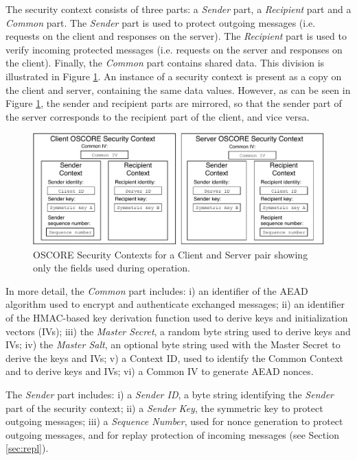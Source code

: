 {The security context consists of three parts:  a \emph{Sender} part, a \emph{Recipient} part and a \emph{Common} part. The \emph{Sender} part is used to protect outgoing messages (i.e. requests on the client and responses on the server). The \emph{Recipient} part is used to verify incoming protected messages (i.e. requests on the server and responses on the client). Finally, the \emph{Common} part contains shared data. This division is illustrated in Figure \ref{fig:security_context}. An instance of a security context is present as a copy on the client and server, containing the same data values. However, as can be seen in Figure \ref{fig:security_context}, the sender and recipient parts are mirrored, so that the sender part of the server corresponds to the recipient part of the client, and vice versa.
\begin{figure}[ht]
    \centering
     \includegraphics[width=\textwidth]{papers/oscore/images/OSCORE_contexts.pdf}
    \caption{OSCORE Security Contexts for a Client and Server pair showing only the fields used during operation.}
    \label{fig:security_context}
\end{figure}{}

In more detail, the \emph{Common} part includes: i) an identifier of the AEAD algorithm used to encrypt and authenticate exchanged messages; ii) an identifier of the HMAC-based key derivation function used to derive keys and initialization vectors (IVs); iii) the \emph{Master Secret}, a random byte string used to derive keys and IVs; iv) the \emph{Master Salt}, an optional byte string used with the Master Secret to derive the keys and IVs; v) a Context ID, used to identify the Common Context and to derive keys and IVs; vi) a Common IV to generate AEAD nonces.

The \emph{Sender} part includes: i) a \emph{Sender ID}, a byte string identifying the \emph{Sender} part of the security context; ii) a \emph{Sender Key}, the symmetric key to protect outgoing messages; iii) a \emph{Sequence Number}, used for nonce generation to protect outgoing messages, and for replay protection of incoming messages (see Section \ref{sec:repl}).

}
